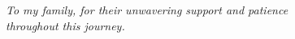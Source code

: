 \thispagestyle{empty}
\vspace*{6.0cm}
\begin{center}
    \textit{To my family, for their unwavering support and patience \\
    throughout this journey.}
\end{center}
\vfill
